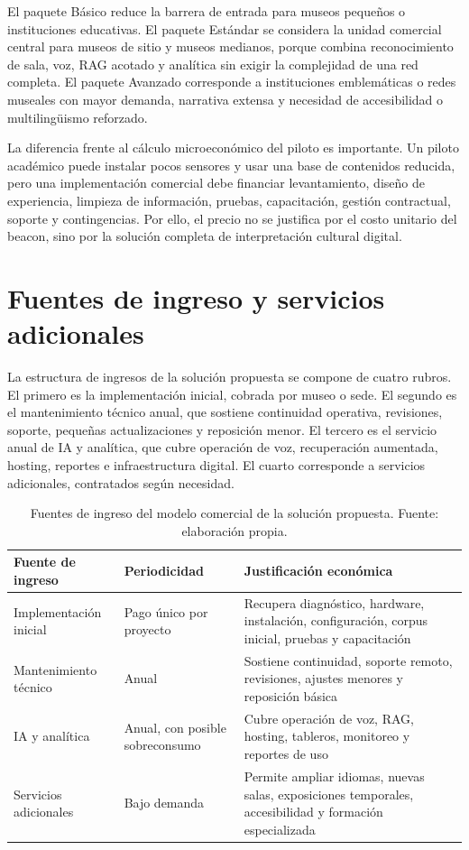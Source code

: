 El paquete Básico reduce la barrera de entrada para museos pequeños o instituciones educativas. El paquete Estándar se considera la unidad comercial central para museos de sitio y museos medianos, porque combina reconocimiento de sala, voz, RAG acotado y analítica sin exigir la complejidad de una red completa. El paquete Avanzado corresponde a instituciones emblemáticas o redes museales con mayor demanda, narrativa extensa y necesidad de accesibilidad o multilingüismo reforzado.

La diferencia frente al cálculo microeconómico del piloto es importante. Un piloto académico puede instalar pocos sensores y usar una base de contenidos reducida, pero una implementación comercial debe financiar levantamiento, diseño de experiencia, limpieza de información, pruebas, capacitación, gestión contractual, soporte y contingencias. Por ello, el precio no se justifica por el costo unitario del beacon, sino por la solución completa de interpretación cultural digital.

\section{Fuentes de ingreso y servicios adicionales}

La estructura de ingresos de la solución propuesta se compone de cuatro rubros. El primero es la implementación inicial, cobrada por museo o sede. El segundo es el mantenimiento técnico anual, que sostiene continuidad operativa, revisiones, soporte, pequeñas actualizaciones y reposición menor. El tercero es el servicio anual de IA y analítica, que cubre operación de voz, recuperación aumentada, hosting, reportes e infraestructura digital. El cuarto corresponde a servicios adicionales, contratados según necesidad.

\begin{table}[h!]
	\centering
	\footnotesize
	\setlength{\tabcolsep}{4pt}
	\begin{tabular}{>{\raggedright\arraybackslash}p{4.2cm} >{\raggedright\arraybackslash}p{4.0cm} >{\raggedright\arraybackslash}p{6.1cm}}
		\hline
		\textbf{Fuente de ingreso} & \textbf{Periodicidad} & \textbf{Justificación económica} \\
		\hline
		Implementación inicial & Pago único por proyecto & Recupera diagnóstico, hardware, instalación, configuración, corpus inicial, pruebas y capacitación \\
		Mantenimiento técnico & Anual & Sostiene continuidad, soporte remoto, revisiones, ajustes menores y reposición básica \\
		IA y analítica & Anual, con posible sobreconsumo & Cubre operación de voz, RAG, hosting, tableros, monitoreo y reportes de uso \\
		Servicios adicionales & Bajo demanda & Permite ampliar idiomas, nuevas salas, exposiciones temporales, accesibilidad y formación especializada \\
		\hline
	\end{tabular}
	\caption[Fuentes de ingreso del modelo comercial]{Fuentes de ingreso del modelo comercial de la solución propuesta. Fuente: elaboración propia.}
	\label{tab:fuentes-ingreso-museiq}
\end{table}

